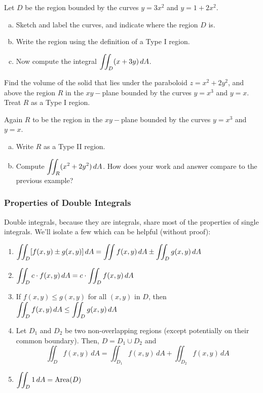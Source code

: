 \documentclass[notes]{subfiles}
\begin{document}
			\begin{ex}
				Let $D$ be the region bounded by the curves $y = 3x^2$ and $y = 1+2x^2$.
				\begin{enumerate}[(a)]
					\item Sketch and label the curves, and indicate where the region $D$ is.
					\item Write the region using the definition of a Type I region.
					\item Now compute the integral $\displaystyle \iint_D (x+3y)\, dA$.
				\end{enumerate}
			\end{ex}
			
			\begin{ex}
				Find the volume of the solid that lies under the paraboloid $z = x^2 +2y^2$, and above the region $R$ in the $xy-$plane bounded by the curves $y = x^3$ and $y = x$. Treat $R$ as a Type I region.
			\end{ex}
				\vs{1}
				
			\begin{ex}
				Again $R$ to be the region in the $xy-$plane bounded by the curves $y = x^3$ and $y = x$.
				\begin{enumerate}[(a)]
					\item Write $R$ as a Type II region. 	
						\vs{1}
						
					\item Compute $\displaystyle \iint_R (x^2 + 2y^2)\, dA$. How does your work and answer compare to the previous example?
						\vs{1}
				\end{enumerate}
			\end{ex}
		\subsubsection*{Properties of Double Integrals}
			Double integrals, because they are integrals, share most of the properties of single integrals. We'll isolate a few which can be helpful (without proof):
			\begin{enumerate}
				\item $\displaystyle \iint_D [f(x,y) \pm g(x,y)]\, dA = \iint f(x,y)\, dA \pm \iint_D g(x,y)\, dA$
				\item $\displaystyle \iint_D c\cdot f(x,y)\, dA = c\cdot \iint_D f(x,y)\, dA$
				\item If $f(x,y)\leq g(x,y)$ for all $(x,y)$ in $D$, then $\displaystyle \iint_D f(x,y)\, dA \leq \iint_D g(x,y)\, dA$
				\item Let $D_1$ and $D_2$ be two non-overlapping regions (except potentially on their common boundary). Then, $D= D_1\cup D_2$ and
					\[\iint_D f(x,y)\, dA = \iint_{D_1} f(x,y)\, dA + \iint_{D_2} f(x,y)\, dA\]
				\item $\displaystyle \iint_D 1\, dA = \text{Area}(D)$
			\end{enumerate}
	
\end{document}
